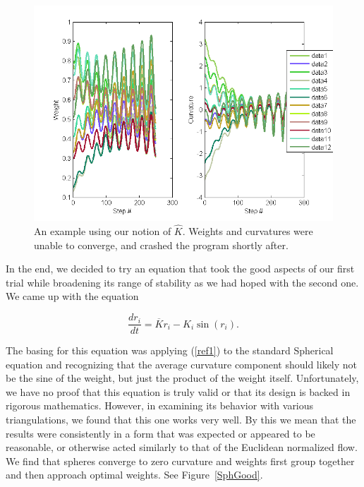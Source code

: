 \documentclass[12pt]{article}
\begin{document}
\begin{itemize}
\begin{figure}
\centering
\includegraphics[scale = 0.65]{Pictures/kHatResult.png}
\caption{An example using our notion of $\hat{K}$. Weights and curvatures were unable to converge, and crashed the program shortly after.}
\label{kHat}
\end{figure}

\end{itemize}

\noindent In the end, we decided to try an equation that took the good aspects of our first trial while broadening its range of stability as we had hoped with the second one. We came up with the equation

\begin{equation}
\label{SRicciN}
\frac{dr_i}{dt} = \overline{K}r_i - K_i\sin(r_i).
\end{equation}

\noindent The basing for this equation was applying (\ref{ref1}) to the standard Spherical equation and recognizing that the average curvature component should likely not be the sine of the weight, but just the product of the weight itself. Unfortunately, we have no proof that this equation is truly valid or that its design is backed in rigorous mathematics. However, in examining its behavior with various triangulations, we found that this one works very well. By this we mean that the results were consistently in a form that was expected or appeared to be reasonable, or otherwise acted similarly to that of the Euclidean normalized flow. We find that spheres converge to zero curvature and weights first group together and then approach optimal weights. See Figure~\ref{SphGood}.\newline
\end{document}

